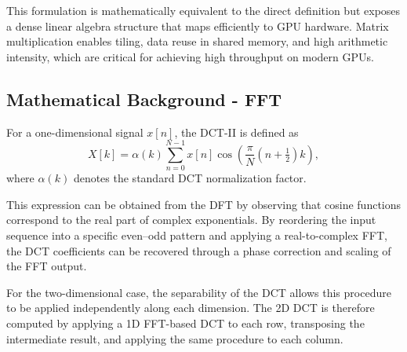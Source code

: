 \documentclass{article}
\begin{document}
This formulation is mathematically equivalent to the direct definition but exposes a dense linear algebra structure that maps efficiently to GPU hardware. Matrix multiplication enables tiling, data reuse in shared memory, and high arithmetic intensity, which are critical for achieving high throughput on modern GPUs.

\subsection{Mathematical Background - FFT}

For a one-dimensional signal $x[n]$, the DCT-II is defined as
\begin{equation}
X[k] = \alpha(k)\sum_{n=0}^{N-1} x[n]
\cos\left(\frac{\pi}{N}\left(n + \tfrac{1}{2}\right)k\right),
\end{equation}
where $\alpha(k)$ denotes the standard DCT normalization factor.

This expression can be obtained from the DFT by observing that cosine functions correspond to the real part of complex exponentials. By reordering the input sequence into a specific even--odd pattern and applying a real-to-complex FFT, the DCT coefficients can be recovered through a phase correction and scaling of the FFT output.

For the two-dimensional case, the separability of the DCT allows this procedure to be applied independently along each dimension. The 2D DCT is therefore computed by applying a 1D FFT-based DCT to each row, transposing the intermediate result, and applying the same procedure to each column.



% 
% 
\end{document}
